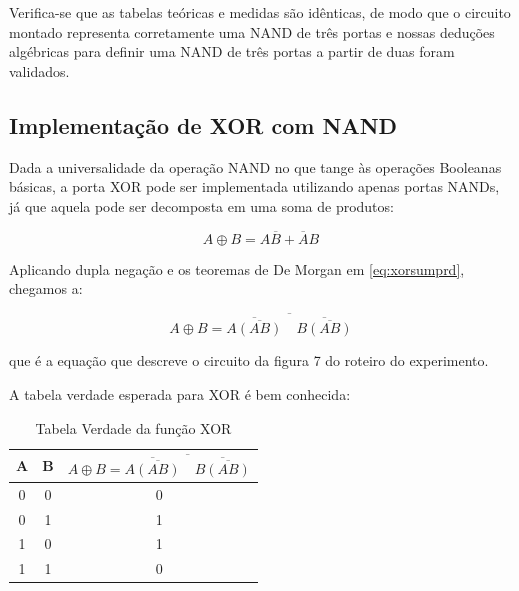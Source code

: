 \documentclass[12pt]{article}
\begin{document}
Verifica-se que as tabelas teóricas e medidas são idênticas, de modo que
o circuito montado representa corretamente uma NAND de três portas e
nossas deduções algébricas para definir uma NAND de três portas a partir de
duas foram validados.

\subsection{Implementação de XOR com NAND}
\label{sec:xornand}

Dada a universalidade da operação NAND no que tange às operações Booleanas básicas,
a porta XOR pode ser implementada utilizando apenas portas NANDs,
já que aquela pode ser decomposta em uma soma de produtos:

\begin{equation}
    \label{eq:xorsumprd}
    A \oplus B = A\overline{B} + \overline{A}B
\end{equation}

Aplicando dupla negação e os teoremas de De Morgan em \ref{eq:xorsumprd}, chegamos a:

\begin{equation}
    \label{eq:xornand}
    A \oplus B = \overline{\overline{A\overline{(AB)}}\quad\overline{B\overline{(AB)}}} 
\end{equation}

\noindent que é a equação que descreve o circuito da figura 7 do roteiro do experimento.

A tabela verdade esperada para XOR é bem conhecida:

\begin{table}[H]

    \centering

    \caption{Tabela Verdade da função XOR}

    \label{tab:tabela-xor}

    \begin{tabular}{|c|c|c|}

        \hline

        A & B & \(A \oplus B = \overline{\overline{A\overline{(AB)}}\quad\overline{B\overline{(AB)}}} \)\\

        \hline

        0 & 0 & 0 \\

        \hline

        0 & 1 & 1 \\

        \hline

        1 & 0 & 1 \\

        \hline

        1 & 1 & 0 \\

        \hline

    \end{tabular}

\end{table}
\end{document}
